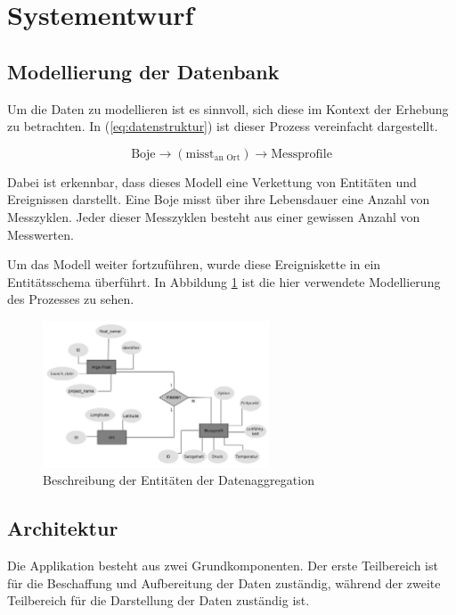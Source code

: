 \section{Systementwurf}

\subsection{Modellierung der Datenbank}

Um die Daten zu modellieren ist es sinnvoll, sich diese im Kontext der Erhebung zu betrachten. In (\ref{eq:datenstruktur}) ist dieser Prozess vereinfacht dargestellt.

\begin{equation}
    \mbox{Boje} \to (\mbox{misst}_{\mbox{an Ort}}) \to \mbox{Messprofile}\label{eq:datenstruktur}
\end{equation}

Dabei ist erkennbar, dass dieses Modell eine Verkettung von Entitäten und Ereignissen darstellt. Eine Boje misst über ihre Lebensdauer eine Anzahl von Messzyklen. Jeder dieser Messzyklen besteht aus einer gewissen Anzahl von Messwerten.

Um das Modell weiter fortzuführen, wurde diese Ereigniskette in ein Entitätsschema überführt. In Abbildung \ref{fig:ERM} ist die hier verwendete Modellierung des Prozesses zu sehen.

\begin{figure}[h!]
    \centering
    \includegraphics[width=0.6\textwidth,clip=true,trim=0pt 0pt 0pt 0pt]{pix/erm.png}
    \caption{Beschreibung der Entitäten der Datenaggregation}
    \label{fig:ERM}
\end{figure}


\subsection{Architektur}


Die Applikation  besteht aus zwei Grundkomponenten. Der erste Teilbereich ist für die Beschaffung und Aufbereitung der Daten zuständig, während der zweite Teilbereich für die Darstellung der Daten zuständig ist.

